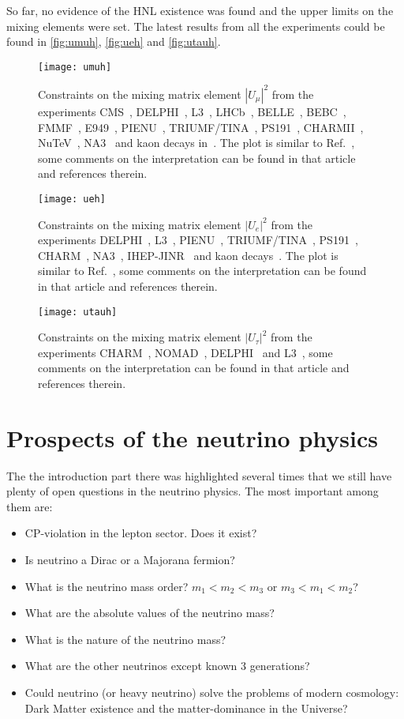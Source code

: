 \documentclass[../main.tex]{subfiles}
\begin{document}
So far, no evidence of the HNL existence was found and the upper limits on the mixing elements were set. The latest results from all the experiments could be found in \autoref{fig:umuh}, \autoref{fig:ueh} and \autoref{fig:utauh}.

\begin{figure}[!ht]
\texttt{[image: umuh]}
\caption{Constraints on the mixing matrix element $|U_{\mu}|^2$ from the experiments CMS~\cite{cms}, DELPHI~\cite{delphi}, L3~\cite{l3}, LHCb~\cite{lhcb}, BELLE~\cite{belle}, BEBC~\cite{bebc}, FMMF~\cite{fmmf}, E949~\cite{e949}, PIENU~\cite{pienu}, TRIUMF/TINA~\cite{triumf}, PS191~\cite{bernardi1988further}, CHARMII~\cite{charm2}, NuTeV~\cite{nutev}, NA3~\cite{na3} and kaon decays in~\cite{kaon1,kaon2}. The plot is similar to Ref.~\cite{drewes}, some comments on the interpretation can be found in that article and references therein.}
\label{fig:umuh}
\end{figure}
\begin{figure}[!ht]
\texttt{[image: ueh]}
\caption{Constraints on the mixing matrix element $|U_{e}|^2$ from the experiments  DELPHI~\cite{delphi},  L3~\cite{l3}, PIENU~\cite{pienu}, TRIUMF/TINA~\cite{triumf}, PS191~\cite{bernardi1988further}, CHARM~\cite{charm}, NA3~\cite{na3}, IHEP-JINR~\cite{jinr} and kaon decays~\cite{kaon1}. The plot is similar to Ref.~\cite{drewes}, some comments on the interpretation can be found in that article and references therein.}
\label{fig:ueh}
\end{figure}
\begin{figure}[!ht]
\texttt{[image: utauh]}
\caption{Constraints on the mixing matrix element $|U_{\tau}|^2$ from the experiments  CHARM~\cite{orloff2002limits}, NOMAD~\cite{baldisseris2001search}, DELPHI~\cite{delphi} and L3~\cite{l3}, some comments on the interpretation can be found in that article and references therein.}
\label{fig:utauh}
\end{figure}

\chapter{Prospects of the neutrino physics}
The the introduction part there was highlighted several times that we still have plenty of open questions in the neutrino physics. The most important among them are:
\begin{itemize}
  \item CP-violation in the lepton sector. Does it exist?
  \item Is neutrino a Dirac or a Majorana fermion?
  \item What is the neutrino mass order? $m_1<m_2<m_3$ or $m_3<m_1<m_2$?
  \item What are the absolute values of the neutrino mass?
  \item What is the nature of the neutrino mass?
  \item What are the other neutrinos except known 3 generations?
  \item Could neutrino (or heavy neutrino) solve the problems of modern cosmology: Dark Matter existence and the matter-dominance in the Universe?
\end{itemize}
\end{document}
